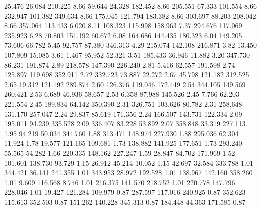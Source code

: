   25.476   26.084  210.225         8.66
  59.644   24.328  182.452         8.66
 205.551   67.333  101.554         8.66
 232.947  101.382  349.634         8.66
 175.045  121.794  183.382         8.66
 303.697   88.203  208.042         8.66
 357.064  113.433    6.020         8.11
 108.323  115.998  158.963         7.37
 294.676  117.069  235.923         6.28
  70.803  151.192   60.672         6.08
 164.686  144.435  180.323         6.04
 149.205   73.606   66.782         5.45
  92.757   87.380  346.313         4.29
 215.074  142.108  216.871         3.82
  13.450  107.809   15.085         3.61
   1.467   95.952   52.321         3.51
 185.433   36.946   11.882         3.20
 347.730   86.231  191.874         2.89
 218.578  147.390  226.240         2.81
   5.416   62.557  191.598         2.74
 125.897  119.698  352.911         2.72
 332.723   73.887   22.272         2.67
  45.798  121.182  312.525         2.65
  19.312  121.192  289.874         2.60
 126.376  119.046  172.449         2.54
 344.105  149.569  260.421         2.53
   6.689   46.936   58.657         2.53
   6.358   87.988  145.526         2.45
   7.766   62.203  221.554         2.45
 189.834   64.142  350.390         2.31
 326.751  103.626   80.782         2.31
 258.648  131.170  257.047         2.24
  29.837   85.619  171.356         2.24
 166.507  143.731  122.334         2.09
 195.011   94.239  335.528         2.09
 336.407   83.228   53.892         2.07
 358.848   33.319  227.113         1.95
  94.219   50.034  344.760         1.88
 313.471  148.974  227.930         1.88
 295.036   62.304   11.924         1.78
  19.577  121.165  109.681         1.73
 138.882  141.925  177.651         1.73
 293.240   55.565   54.282         1.66
 220.335  148.162  227.247         1.59
  28.847   84.702  171.969         1.52
 101.601  138.730   93.729         1.15
  26.912   45.214   10.052         1.15
  42.697   32.584  333.788         1.01
 344.421   36.141  241.355         1.01
 343.953   28.972  192.528         1.01
 138.967  142.160  358.260         1.01
   9.609  116.568    8.746         1.01
 216.375  141.570  218.752         1.01
 220.778  147.796  228.046         1.01
  19.427  121.284  109.979         0.87
 287.597  117.016  240.925         0.87
 352.623  115.613  352.503         0.87
 151.262  140.228  345.313         0.87
 184.448   44.363  171.585         0.87
